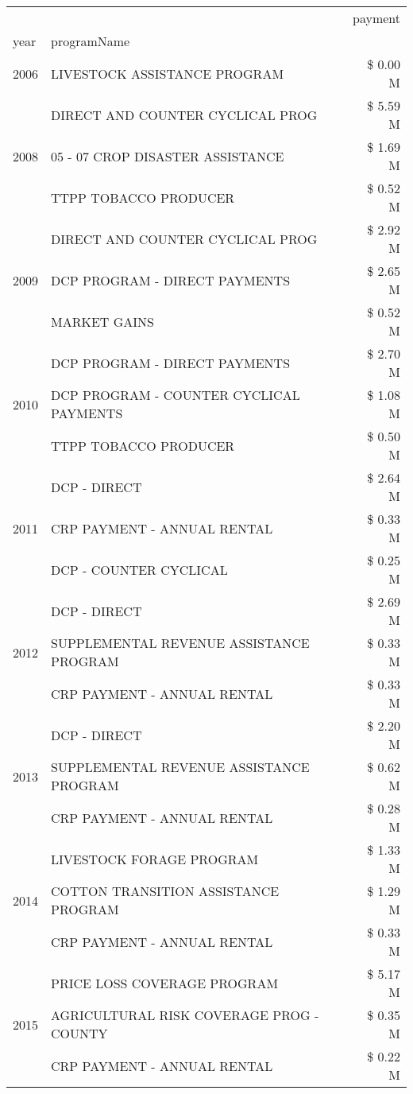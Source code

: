 \begin{tabular}{llr}
\toprule
 &  & payment \\
year & programName &  \\
\midrule
2006 & LIVESTOCK ASSISTANCE PROGRAM & \$ 0.00 M \\
\cline{1-3}
\multirow[t]{3}{*}{2008} & DIRECT AND COUNTER CYCLICAL PROG & \$ 5.59 M \\
 & 05 - 07 CROP DISASTER ASSISTANCE & \$ 1.69 M \\
 & TTPP TOBACCO PRODUCER & \$ 0.52 M \\
\cline{1-3}
\multirow[t]{3}{*}{2009} & DIRECT AND COUNTER CYCLICAL PROG & \$ 2.92 M \\
 & DCP PROGRAM - DIRECT PAYMENTS & \$ 2.65 M \\
 & MARKET GAINS & \$ 0.52 M \\
\cline{1-3}
\multirow[t]{3}{*}{2010} & DCP PROGRAM - DIRECT PAYMENTS & \$ 2.70 M \\
 & DCP PROGRAM - COUNTER CYCLICAL PAYMENTS & \$ 1.08 M \\
 & TTPP TOBACCO PRODUCER & \$ 0.50 M \\
\cline{1-3}
\multirow[t]{3}{*}{2011} & DCP - DIRECT & \$ 2.64 M \\
 & CRP PAYMENT - ANNUAL RENTAL & \$ 0.33 M \\
 & DCP - COUNTER CYCLICAL & \$ 0.25 M \\
\cline{1-3}
\multirow[t]{3}{*}{2012} & DCP - DIRECT & \$ 2.69 M \\
 & SUPPLEMENTAL REVENUE ASSISTANCE PROGRAM & \$ 0.33 M \\
 & CRP PAYMENT - ANNUAL RENTAL & \$ 0.33 M \\
\cline{1-3}
\multirow[t]{3}{*}{2013} & DCP - DIRECT & \$ 2.20 M \\
 & SUPPLEMENTAL REVENUE ASSISTANCE PROGRAM & \$ 0.62 M \\
 & CRP PAYMENT - ANNUAL RENTAL & \$ 0.28 M \\
\cline{1-3}
\multirow[t]{3}{*}{2014} & LIVESTOCK FORAGE PROGRAM & \$ 1.33 M \\
 & COTTON TRANSITION ASSISTANCE PROGRAM & \$ 1.29 M \\
 & CRP PAYMENT - ANNUAL RENTAL & \$ 0.33 M \\
\cline{1-3}
\multirow[t]{3}{*}{2015} & PRICE LOSS COVERAGE PROGRAM & \$ 5.17 M \\
 & AGRICULTURAL RISK COVERAGE PROG - COUNTY & \$ 0.35 M \\
 & CRP PAYMENT - ANNUAL RENTAL & \$ 0.22 M \\

\end{tabular}
